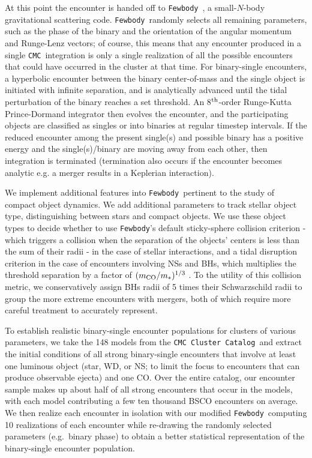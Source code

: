 \documentclass[twocolumn,linenumbers]{aastex631}
\newcommand{\CMC}{\texttt{CMC}}
\newcommand{\CMCcat}{\texttt{CMC Cluster Catalog}}
\newcommand{\fewbody}{\texttt{Fewbody}}
\begin{document}
At this point the encounter is handed off to \fewbody\ \citep{2004MNRAS.352....1F}, a small-$N$-body gravitational scattering code.
\fewbody\ randomly selects all remaining parameters, such as the phase of the binary and the orientation of the angular momentum and Runge-Lenz vectors; of course, this means that any encounter produced in a single \CMC\ integration is only a single realization of all the possible encounters that could have occurred in the cluster at that time.
For binary-single encounters, a hyperbolic encounter between the binary center-of-mass and the single object is initiated with infinite separation, and is analytically advanced until the tidal perturbation of the binary reaches a set threshold.
An 8$^{\rm th}$-order Runge-Kutta Prince-Dormand integrator then evolves the encounter, and the participating objects are classified as singles or into binaries at regular timestep intervals.
If the reduced encounter among the present single(s) and possible binary has a positive energy and the single(s)/binary are moving away from each other, then integration is terminated (termination also occurs if the encounter becomes analytic e.g. a merger results in a Keplerian interaction).

We implement additional features into \fewbody\ pertinent to the study of compact object dynamics.
We add additional parameters to track stellar object type, distinguishing between stars and compact objects.%
We use these object types to decide whether to use \fewbody's default sticky-sphere collision criterion - which triggers a collision when the separation of the objects' centers is less than the sum of their radii - in the case of stellar interactions, and a tidal disruption criterion in the case of encounters involving NSs and BHs, which multiplies the threshold separation by a factor of $(m_{\rm CO} / m_{*})^{1/3}$ \citep[as was done in][]{Kremer2019}.
To the utility of this collision metric, we conservatively assign BHs radii of 5 times their Schwarzschild radii to group the more extreme encounters with mergers, both of which require more careful treatment to accurately represent.

To establish realistic binary-single encounter populations for clusters of various parameters, we take the 148 models from the \CMCcat\ and extract the initial conditions of all strong binary-single encounters that involve at least one luminous object (star, WD, or NS; to limit the focus to encounters that can produce observable ejecta) and one CO.
Over the entire catalog, our encounter sample makes up about half of all strong encounters that occur in the models, with each model contributing a few ten thousand BSCO encounters on average.
We then realize each encounter in isolation with our modified \fewbody\, computing 10 realizations of each encounter while re-drawing the randomly selected parameters (e.g.~binary phase) to obtain a better statistical representation of the binary-single encounter population.
\end{document}
